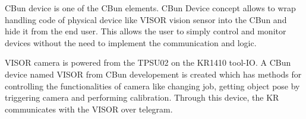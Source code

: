 CBun device is one of the CBun elements. CBun Device concept allows to wrap handling code of physical device like VISOR vision sensor into the CBun and hide it from the end user. This allows the user to simply control and monitor devices without the need to implement the communication and logic. \cite{cbun-device}

VISOR camera is powered from the TPSU02 on the KR1410 tool-IO.
A CBun device named VISOR from CBun developement is created which has methods for
controlling the functionalities of camera like changing job, getting object pose by triggering camera and performing calibration. Through this
device, the KR communicates with the VISOR over telegram.

